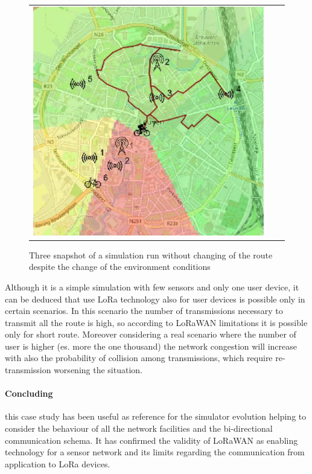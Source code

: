 \begin{figure}[h]
\begin{tabular}{lll}
         \includegraphics[scale=0.42]{figures/sim2snap3.png} 
    \end{tabular}
    \caption{Three snapshot of a simulation run without changing of the route despite the change of the environment conditions}
    \label{fig:sim2}
\end{figure}
% 

Although it is a simple simulation with few sensors and only one user device, it can be deduced that use LoRa technology also for user devices is possible only in certain scenarios.
In this scenario the number of transmissions necessary to transmit all the route is high, so according to LoRaWAN limitations it is possible only for short route.
Moreover considering a real scenario where the number of user is higher (es. more the one thousand) the network congestion will increase with also the probability of collision among transmissions, which require re-transmission worsening the situation.
\paragraph{Concluding} this case study has been useful as reference for the simulator evolution helping to consider the behaviour of all the network facilities and the bi-directional communication schema.
It has confirmed the validity of LoRaWAN as enabling technology for a sensor network and its limits regarding the communication from application to LoRa devices.

